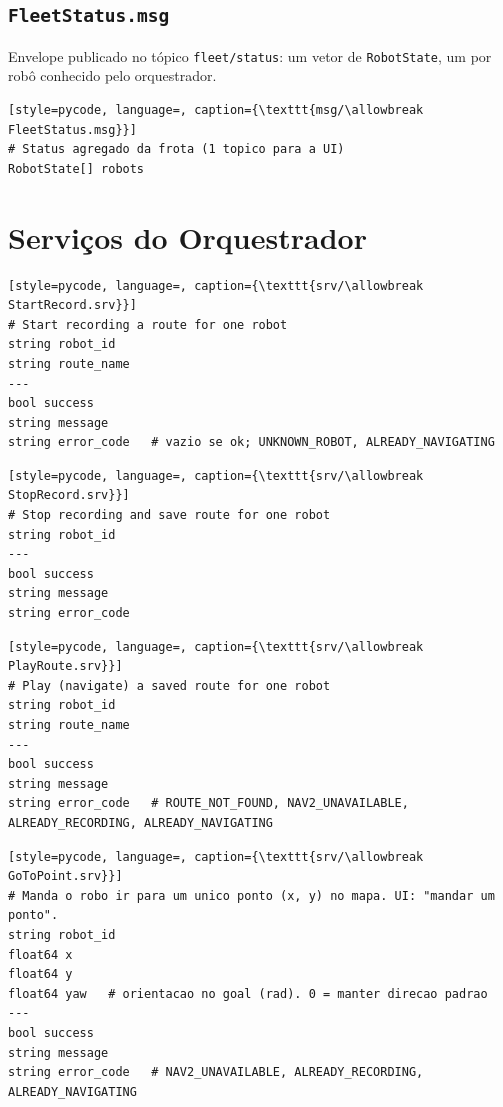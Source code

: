 \subsection{\texttt{FleetStatus.msg}}

Envelope publicado no tópico \texttt{fleet/\allowbreak status}: um vetor de \texttt{RobotState},
um por robô conhecido pelo orquestrador.

\begin{lstlisting}[style=pycode, language=, caption={\texttt{msg/\allowbreak FleetStatus.msg}}]
# Status agregado da frota (1 topico para a UI)
RobotState[] robots
\end{lstlisting}

\section{Serviços do Orquestrador}

\begin{lstlisting}[style=pycode, language=, caption={\texttt{srv/\allowbreak StartRecord.srv}}]
# Start recording a route for one robot
string robot_id
string route_name
---
bool success
string message
string error_code   # vazio se ok; UNKNOWN_ROBOT, ALREADY_NAVIGATING
\end{lstlisting}

\begin{lstlisting}[style=pycode, language=, caption={\texttt{srv/\allowbreak StopRecord.srv}}]
# Stop recording and save route for one robot
string robot_id
---
bool success
string message
string error_code
\end{lstlisting}

\begin{lstlisting}[style=pycode, language=, caption={\texttt{srv/\allowbreak PlayRoute.srv}}]
# Play (navigate) a saved route for one robot
string robot_id
string route_name
---
bool success
string message
string error_code   # ROUTE_NOT_FOUND, NAV2_UNAVAILABLE, ALREADY_RECORDING, ALREADY_NAVIGATING
\end{lstlisting}

\begin{lstlisting}[style=pycode, language=, caption={\texttt{srv/\allowbreak GoToPoint.srv}}]
# Manda o robo ir para um unico ponto (x, y) no mapa. UI: "mandar um ponto".
string robot_id
float64 x
float64 y
float64 yaw   # orientacao no goal (rad). 0 = manter direcao padrao
---
bool success
string message
string error_code   # NAV2_UNAVAILABLE, ALREADY_RECORDING, ALREADY_NAVIGATING
\end{lstlisting}

